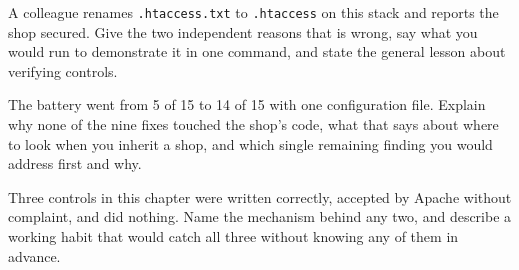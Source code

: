 \begin{checkpoint}
\begin{tightnum}
  \item A colleague renames \texttt{.htaccess.txt} to \texttt{.htaccess} on
        this stack and reports the shop secured. Give the two independent
        reasons that is wrong, say what you would run to demonstrate it in one
        command, and state the general lesson about verifying controls.
  \item The battery went from 5 of 15 to 14 of 15 with one configuration file.
        Explain why none of the nine fixes touched the shop's code, what that
        says about where to look when you inherit a shop, and which single
        remaining finding you would address first and why.
  \item Three controls in this chapter were written correctly, accepted by
        Apache without complaint, and did nothing. Name the mechanism behind
        any two, and describe a working habit that would catch all three
        without knowing any of them in advance.
\end{tightnum}
\end{checkpoint}

